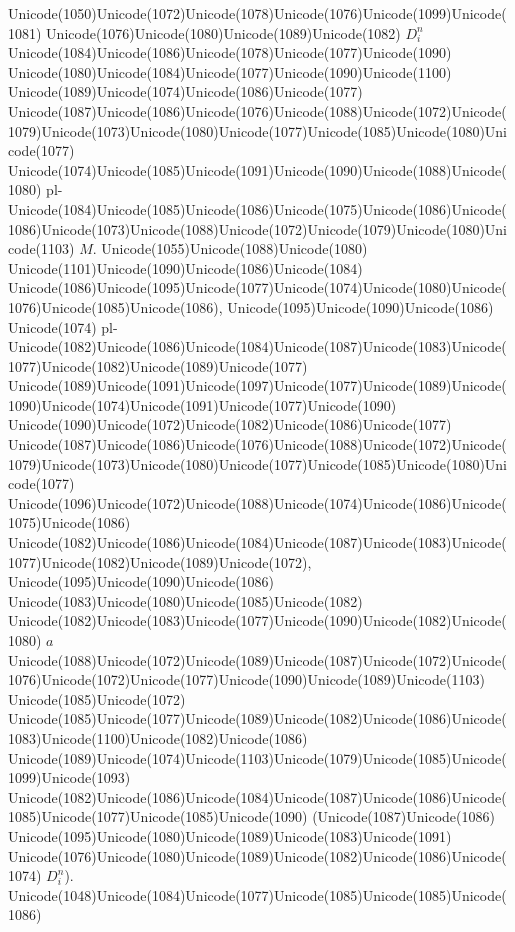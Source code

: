 \documentclass[a4paper,11pt]{report}
\begin{document}
{{{\begin{Verbatim}[commandchars=!@|,fontsize=\small,frame=single,label=Пример]
\end{Verbatim}
 Unicode(1050)Unicode(1072)Unicode(1078)Unicode(1076)Unicode(1099)Unicode(1081)
Unicode(1076)Unicode(1080)Unicode(1089)Unicode(1082) $D^n_i$ Unicode(1084)Unicode(1086)Unicode(1078)Unicode(1077)Unicode(1090)
Unicode(1080)Unicode(1084)Unicode(1077)Unicode(1090)Unicode(1100)
Unicode(1089)Unicode(1074)Unicode(1086)Unicode(1077)
Unicode(1087)Unicode(1086)Unicode(1076)Unicode(1088)Unicode(1072)Unicode(1079)Unicode(1073)Unicode(1080)Unicode(1077)Unicode(1085)Unicode(1080)Unicode(1077)
Unicode(1074)Unicode(1085)Unicode(1091)Unicode(1090)Unicode(1088)Unicode(1080)
pl-Unicode(1084)Unicode(1085)Unicode(1086)Unicode(1075)Unicode(1086)Unicode(1086)Unicode(1073)Unicode(1088)Unicode(1072)Unicode(1079)Unicode(1080)Unicode(1103) $M.$ Unicode(1055)Unicode(1088)Unicode(1080)
Unicode(1101)Unicode(1090)Unicode(1086)Unicode(1084)
Unicode(1086)Unicode(1095)Unicode(1077)Unicode(1074)Unicode(1080)Unicode(1076)Unicode(1085)Unicode(1086),
Unicode(1095)Unicode(1090)Unicode(1086) Unicode(1074)
pl-Unicode(1082)Unicode(1086)Unicode(1084)Unicode(1087)Unicode(1083)Unicode(1077)Unicode(1082)Unicode(1089)Unicode(1077)
Unicode(1089)Unicode(1091)Unicode(1097)Unicode(1077)Unicode(1089)Unicode(1090)Unicode(1074)Unicode(1091)Unicode(1077)Unicode(1090)
Unicode(1090)Unicode(1072)Unicode(1082)Unicode(1086)Unicode(1077)
Unicode(1087)Unicode(1086)Unicode(1076)Unicode(1088)Unicode(1072)Unicode(1079)Unicode(1073)Unicode(1080)Unicode(1077)Unicode(1085)Unicode(1080)Unicode(1077)
Unicode(1096)Unicode(1072)Unicode(1088)Unicode(1074)Unicode(1086)Unicode(1075)Unicode(1086)
Unicode(1082)Unicode(1086)Unicode(1084)Unicode(1087)Unicode(1083)Unicode(1077)Unicode(1082)Unicode(1089)Unicode(1072),
Unicode(1095)Unicode(1090)Unicode(1086)
Unicode(1083)Unicode(1080)Unicode(1085)Unicode(1082)
Unicode(1082)Unicode(1083)Unicode(1077)Unicode(1090)Unicode(1082)Unicode(1080) $a$ Unicode(1088)Unicode(1072)Unicode(1089)Unicode(1087)Unicode(1072)Unicode(1076)Unicode(1072)Unicode(1077)Unicode(1090)Unicode(1089)Unicode(1103)
Unicode(1085)Unicode(1072)
Unicode(1085)Unicode(1077)Unicode(1089)Unicode(1082)Unicode(1086)Unicode(1083)Unicode(1100)Unicode(1082)Unicode(1086)
Unicode(1089)Unicode(1074)Unicode(1103)Unicode(1079)Unicode(1085)Unicode(1099)Unicode(1093)
Unicode(1082)Unicode(1086)Unicode(1084)Unicode(1087)Unicode(1086)Unicode(1085)Unicode(1077)Unicode(1085)Unicode(1090)
(Unicode(1087)Unicode(1086)
Unicode(1095)Unicode(1080)Unicode(1089)Unicode(1083)Unicode(1091)
Unicode(1076)Unicode(1080)Unicode(1089)Unicode(1082)Unicode(1086)Unicode(1074) $D^n_i$).
Unicode(1048)Unicode(1084)Unicode(1077)Unicode(1085)Unicode(1085)Unicode(1086)
}}}
\end{document}
